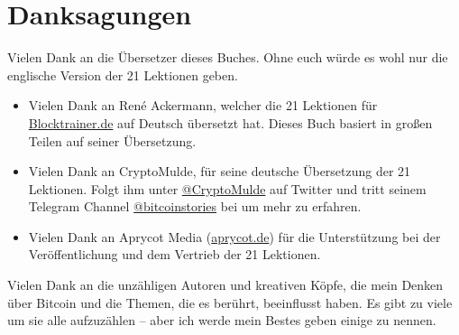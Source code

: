 \chapter*{Danksagungen}

Vielen Dank an die Übersetzer dieses Buches. Ohne euch würde es wohl nur die englische Version der
21 Lektionen geben.

\begin{itemize}
  \item Vielen Dank an René Ackermann, welcher die 21 Lektionen für
  \href{https://blocktrainer.de}{Blocktrainer.de} auf Deutsch übersetzt hat.
  Dieses Buch basiert in großen Teilen auf seiner Übersetzung.
  \item Vielen Dank an CryptoMulde, für seine deutsche Übersetzung der 21
  Lektionen. Folgt ihm unter
  \href{https://twitter.com/CryptoMulde}{@CryptoMulde} auf Twitter und tritt
  seinem Telegram Channel
  \href{https://t.me/bitcoinstories}{@bitcoinstories} bei um mehr zu erfahren.
  \item Vielen Dank an Aprycot Media (\href{https://www.aprycot.de}{aprycot.de})
  für die Unterstützung bei der Veröffentlichung und dem Vertrieb der 21
  Lektionen.
\end{itemize}


Vielen Dank an die unzähligen Autoren und kreativen Köpfe, die mein Denken über
Bitcoin und die Themen, die es berührt, beeinflusst haben. Es gibt zu viele um
sie alle aufzuzählen -- aber ich werde mein Bestes geben einige zu nennen.

